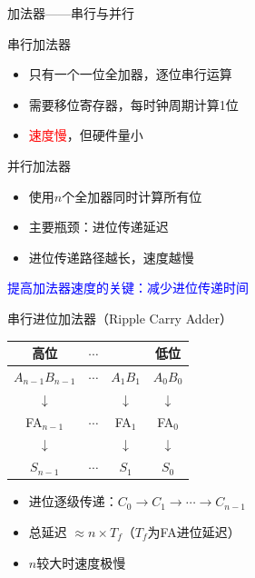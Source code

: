 \documentclass[10pt, aspectratio=169]{beamer}
\begin{document}
\begin{frame}{加法器——串行与并行}
    \begin{block}{串行加法器}
        \begin{itemize}
            \item 只有一个一位全加器，逐位串行运算
            \item 需要移位寄存器，每时钟周期计算1位
            \item \textcolor{red}{速度慢}，但硬件量小
        \end{itemize}
    \end{block}
    \begin{block}{并行加法器}
        \begin{itemize}
            \item 使用$n$个全加器同时计算所有位
            \item 主要瓶颈：进位传递延迟
            \item 进位传递路径越长，速度越慢
        \end{itemize}
    \end{block}
    \vspace{0.3em}
    \begin{center}
        \textcolor{blue}{提高加法器速度的关键：减少进位传递时间}
    \end{center}
\end{frame}

\begin{frame}{串行进位加法器（Ripple Carry Adder）}
    \begin{center}
        \begin{tabular}{cccc}
            高位 & $\cdots$ & & 低位 \\
            \hline
            $A_{n-1}B_{n-1}$ & $\cdots$ & $A_1B_1$ & $A_0B_0$ \\
            $\downarrow$ & & $\downarrow$ & $\downarrow$ \\
            FA$_{n-1}$ & $\cdots$ & FA$_1$ & FA$_0$ \\
            $\downarrow$ & & $\downarrow$ & $\downarrow$ \\
            $S_{n-1}$ & $\cdots$ & $S_1$ & $S_0$ \\
        \end{tabular}
    \end{center}
    \vspace{0.5em}
    \begin{itemize}
        \item 进位逐级传递：$C_0 \to C_1 \to \cdots \to C_{n-1}$
        \item 总延迟 $\approx n \times T_f$（$T_f$为FA进位延迟）
        \item $n$较大时速度极慢
    \end{itemize}
\end{frame}
\end{document}
